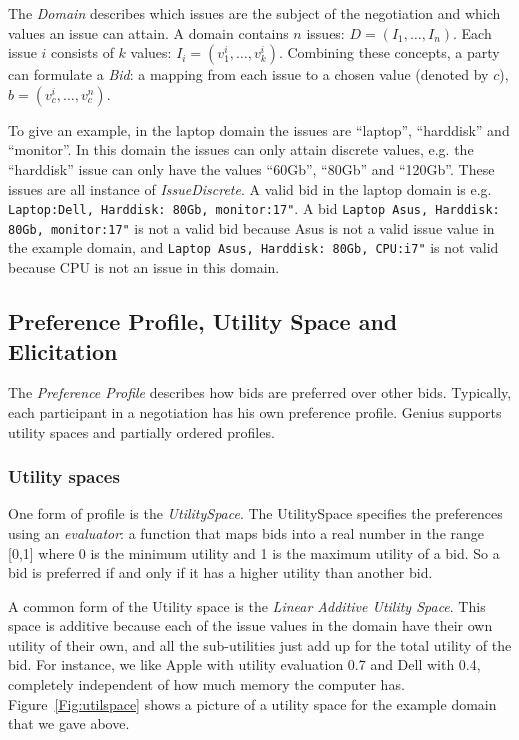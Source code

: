\documentclass[]{article}
\begin{document}
The \textit{Domain} describes which issues are the subject of the negotiation and which values an issue can attain. A domain contains $n$ issues: $D=(I_1,\ldots,I_n)$. Each issue $i$ consists of $k$ values: $I_i=(v^i_1,\ldots,v^i_k)$.  Combining these concepts, a party can formulate a \textit{Bid}: a mapping from each issue to a chosen value (denoted by $c$), $b=(v^i_{c},\ldots,v^n_{c})$. 

To give an example, in the laptop domain the issues are ``laptop'', ``harddisk'' and ``monitor''. In this domain the issues can only attain discrete values, e.g. the ``harddisk'' issue can only have the values ``60Gb'', ``80Gb'' and ``120Gb''. These issues are all instance of \textit{IssueDiscrete}. A valid bid in the laptop domain is e.g. \verb|Laptop:Dell, Harddisk: 80Gb, monitor:17"|. A bid \verb|Laptop Asus, Harddisk: 80Gb, monitor:17"| is not a valid bid because Asus is not a valid issue value in the example domain, and \verb|Laptop Asus, Harddisk: 80Gb, CPU:i7"|  is not valid because CPU is not an issue in this domain. 

\subsection{Preference Profile, Utility Space and Elicitation}
The \textit{Preference Profile} describes how bids are preferred over other bids. Typically, each participant in a negotiation has his own preference profile. Genius supports utility spaces and partially ordered profiles.

\subsubsection{Utility spaces}
One form of profile is the \textit{UtilitySpace}. The UtilitySpace specifies the preferences using an \textit{evaluator}: a function that maps bids into a real number in the range [0,1] where 0 is the minimum utility and 1 is the maximum utility of a bid. So a bid is preferred if and only if it has a higher utility than another bid.

A common form of the Utility space is the \textit{Linear Additive Utility Space}. This space is additive because each of the issue values in the domain have their own utility of their own, and all the sub-utilities just add up for the total utility of the bid. For instance, we like Apple with utility evaluation 0.7 and Dell with 0.4, completely independent of how much memory the computer has. Figure~\ref{Fig:utilspace} shows a picture of a utility space for the example domain that we gave above.
\end{document}

